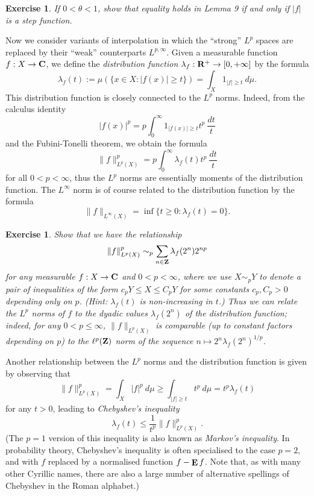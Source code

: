 \documentclass[10pt,reqno]{amsart}
\newtheorem{exercise}[theorem]{Exercise}
\begin{document}
\begin{exercise}
    If $0 < \theta < 1$, show that equality holds in Lemma 9 if and only if $|f|$ is a step function. 
\end{exercise}

Now we consider variants of interpolation in which the “strong” $L^p$ spaces are replaced by their “weak” counterparts $L^{p,\infty}$. Given a measurable function $f: X \rightarrow {\bf C}$, we define the \emph{distribution function} $\lambda_f: {\bf R}^+ \rightarrow [0,+\infty]$ by the formula
%
\[ \lambda_f(t) := \mu ( \{ x \in X: |f(x)| \geq t \} ) = \int_X 1_{|f| \geq t}\ d\mu.\]
%
This distribution function is closely connected to the $L^p$ norms. Indeed, from the calculus identity
%
\[ |f(x)|^p = p \int_0^\infty 1_{|f(x)| \geq t} t^{p}\ \frac{dt}{t}\]
%
and the Fubini-Tonelli theorem, we obtain the formula
%
\begin{equation} \| f \|_{L^p(X)}^p = p \int_0^\infty \lambda_f(t) t^{p}\ \frac{dt}{t} \end{equation}
%
for all $0 < p < \infty$, thus the $L^p$ norms are essentially moments of the distribution function. The $L^\infty$ norm is of course related to the distribution function by the formula
%
\[ \|f\|_{L^\infty(X)} = \inf \{ t \ge 0: \lambda_f(t) = 0 \}.\]

\begin{exercise}
    Show that we have the relationship
    \[     \| f \|_{L^p(X)}^p \sim_p \sum_{n \in {\bf Z}} \lambda_f(2^n) 2^{np}\]
    for any measurable $f: X \rightarrow {\bf C}$ and $0 < p < \infty$, where we use $X \sim_p Y$ to denote a pair of inequalities of the form $c_p Y \leq X \leq C_p Y$ for some constants $c_p, C_p > 0$ depending only on $p$. (Hint: $\lambda_f(t)$ is non-increasing in $t$.) Thus we can relate the $L^p$ norms of $f$ to the dyadic values $\lambda_f(2^n)$ of the distribution function; indeed, for any $0 < p \leq \infty$, $\|f\|_{L^p(X)}$ is comparable (up to constant factors depending on $p$) to the $\ell^p({\bf Z})$ norm of the sequence $n \mapsto 2^n \lambda_f(2^n)^{1/p}$. 
\end{exercise}

Another relationship between the $L^p$ norms and the distribution function is given by observing that
%
\[ \|f\|_{L^p(X)}^p =\int_X |f|^p\ d\mu \geq \int_{|f| \geq t} t^p\ d\mu = t^p \lambda_f(t)\]
%
for any $t > 0$, leading to \emph{Chebyshev’s inequality}
%
\[ \lambda_f(t) \leq \frac{1}{t^p} \|f\|_{L^p(X)}^p.\]
%
(The $p=1$ version of this inequality is also known as \emph{Markov’s inequality}. In probability theory, Chebyshev’s inequality is often specialised to the case $p=2$, and with $f$ replaced by a normalised function $f - \mathop{\bf E} f$. Note that, as with many other Cyrillic names, there are also a large number of alternative spellings of Chebyshev in the Roman alphabet.)
\end{document}
